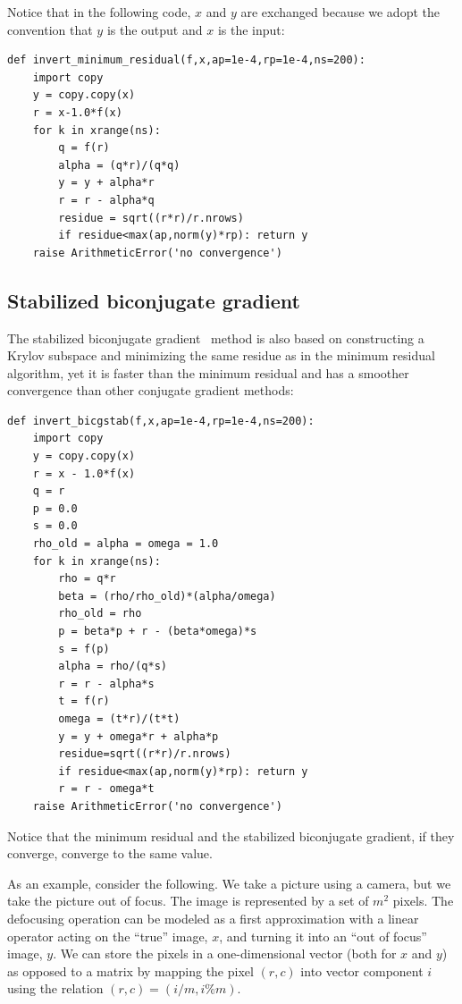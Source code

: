 \documentclass[justified,sixbynine]{tufte-book}
\def\ft{\small\tt}
\theoremstyle{plain}%
\theoremstyle{definition}
\theoremstyle{remark}
\begin{document}
\begin{fullwidth}
Notice that in the following code, $x$ and $y$ are exchanged because we adopt the convention that $y$ is the output and $x$ is the input:

\begin{lstlisting}[caption={in file: {\ft nlib.py}}]
def invert_minimum_residual(f,x,ap=1e-4,rp=1e-4,ns=200):
    import copy
    y = copy.copy(x)
    r = x-1.0*f(x)
    for k in xrange(ns):
        q = f(r)
        alpha = (q*r)/(q*q)
        y = y + alpha*r
        r = r - alpha*q
        residue = sqrt((r*r)/r.nrows)
        if residue<max(ap,norm(y)*rp): return y
    raise ArithmeticError('no convergence')
\end{lstlisting}

\goodbreak\subsection{Stabilized biconjugate gradient}


The stabilized biconjugate gradient~\cite{bicgstab} method is also based on constructing a Krylov subspace and minimizing the same residue as in the minimum residual algorithm, yet it is faster than the minimum residual and has a smoother convergence than other conjugate gradient methods:

\begin{lstlisting}[caption={in file: {\ft nlib.py}}]
def invert_bicgstab(f,x,ap=1e-4,rp=1e-4,ns=200):
    import copy
    y = copy.copy(x)
    r = x - 1.0*f(x)
    q = r
    p = 0.0
    s = 0.0
    rho_old = alpha = omega = 1.0
    for k in xrange(ns):
        rho = q*r
        beta = (rho/rho_old)*(alpha/omega)
        rho_old = rho
        p = beta*p + r - (beta*omega)*s
        s = f(p)
        alpha = rho/(q*s)
        r = r - alpha*s
        t = f(r)
        omega = (t*r)/(t*t)
        y = y + omega*r + alpha*p
        residue=sqrt((r*r)/r.nrows)
        if residue<max(ap,norm(y)*rp): return y
        r = r - omega*t
    raise ArithmeticError('no convergence')
\end{lstlisting}

Notice that the minimum residual and the stabilized biconjugate gradient, if they converge, converge to the same value.

As an example, consider the following. We take a picture using a camera, but we take the picture out of focus. The image is represented by a set of $m^2$ pixels. The defocusing operation can be modeled as a first approximation with a linear operator acting on the ``true'' image, $x$, and turning it into an ``out of focus'' image, $y$. We can store the pixels in a one-dimensional vector (both for $x$ and $y$) as opposed to a matrix by mapping the pixel $(r,c)$ into vector component $i$ using the relation $(r,c) = (i/m,i\%m)$.


\end{fullwidth}
\end{document}

